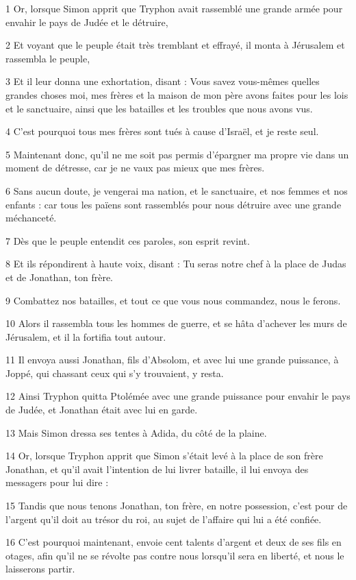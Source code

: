 \par 1 Or, lorsque Simon apprit que Tryphon avait rassemblé une grande armée pour envahir le pays de Judée et le détruire,
\par 2 Et voyant que le peuple était très tremblant et effrayé, il monta à Jérusalem et rassembla le peuple,
\par 3 Et il leur donna une exhortation, disant : Vous savez vous-mêmes quelles grandes choses moi, mes frères et la maison de mon père avons faites pour les lois et le sanctuaire, ainsi que les batailles et les troubles que nous avons vus.
\par 4 C'est pourquoi tous mes frères sont tués à cause d'Israël, et je reste seul.
\par 5 Maintenant donc, qu'il ne me soit pas permis d'épargner ma propre vie dans un moment de détresse, car je ne vaux pas mieux que mes frères.
\par 6 Sans aucun doute, je vengerai ma nation, et le sanctuaire, et nos femmes et nos enfants : car tous les païens sont rassemblés pour nous détruire avec une grande méchanceté.
\par 7 Dès que le peuple entendit ces paroles, son esprit revint.
\par 8 Et ils répondirent à haute voix, disant : Tu seras notre chef à la place de Judas et de Jonathan, ton frère.
\par 9 Combattez nos batailles, et tout ce que vous nous commandez, nous le ferons.
\par 10 Alors il rassembla tous les hommes de guerre, et se hâta d'achever les murs de Jérusalem, et il la fortifia tout autour.
\par 11 Il envoya aussi Jonathan, fils d'Absolom, et avec lui une grande puissance, à Joppé, qui chassant ceux qui s'y trouvaient, y resta.
\par 12 Ainsi Tryphon quitta Ptolémée avec une grande puissance pour envahir le pays de Judée, et Jonathan était avec lui en garde.
\par 13 Mais Simon dressa ses tentes à Adida, du côté de la plaine.
\par 14 Or, lorsque Tryphon apprit que Simon s'était levé à la place de son frère Jonathan, et qu'il avait l'intention de lui livrer bataille, il lui envoya des messagers pour lui dire :
\par 15 Tandis que nous tenons Jonathan, ton frère, en notre possession, c'est pour de l'argent qu'il doit au trésor du roi, au sujet de l'affaire qui lui a été confiée.
\par 16 C'est pourquoi maintenant, envoie cent talents d'argent et deux de ses fils en otages, afin qu'il ne se révolte pas contre nous lorsqu'il sera en liberté, et nous le laisserons partir.
